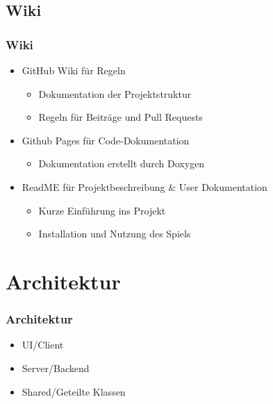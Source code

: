 \documentclass{beamer}
\begin{document}
\subsection{Wiki}
\begin{frame}
\frametitle{Wiki}
  \begin{itemize}
    \item GitHub Wiki für Regeln
      \begin{itemize}
        \item Dokumentation der Projektstruktur
        \item Regeln für Beiträge und Pull Requests
      \end{itemize}
    \item Github Pages für Code-Dokumentation
      \begin{itemize}
        \item Dokumentation erstellt durch Doxygen
      \end{itemize}
    \item ReadME für Projektbeschreibung \& User Dokumentation
      \begin{itemize}
        \item Kurze Einführung ins Projekt
        \item Installation und Nutzung des Spiels
      \end{itemize}
  \end{itemize}  
\end{frame}

\section{Architektur}
\begin{frame}
\frametitle{Architektur}
  \begin{itemize}
    \item UI/Client
    \item Server/Backend
    \item Shared/Geteilte Klassen
  \end{itemize}
\end{frame}
\end{document}
